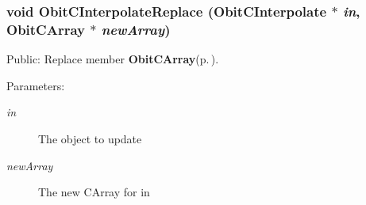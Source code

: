 \subsubsection{\setlength{\rightskip}{0pt plus 5cm}void Obit\-CInterpolate\-Replace ({\bf Obit\-CInterpolate} $\ast$ {\em in}, {\bf Obit\-CArray} $\ast$ {\em new\-Array})}\label{ObitCInterpolate_8c_a14}


Public: Replace member {\bf Obit\-CArray}{\rm (p.\,\pageref{structObitCArray})}. 

\begin{Desc}
\item[Parameters:]
\begin{description}
\item[{\em in}]The object to update \item[{\em new\-Array}]The new CArray for in \end{description}
\end{Desc}
